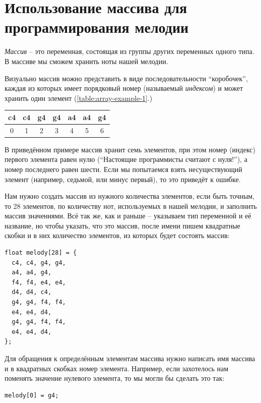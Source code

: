 \documentclass[a4paper,twoside]{book}
\newcounter{example-counter}
\begin{document}
\section{Использование массива для программирования мелодии}

\emph{Массив} -- это переменная, состоящая из группы других переменных одного
типа. В массиве мы сможем хранить ноты нашей мелодии.

Визуально массив можно представить в виде последовательности ``коробочек'',
каждая из которых имеет порядковый номер (называемый \emph{индексом}) и может
хранить один элемент (\ref{table:array-example-1}.)

\begin{tabular}{|p{1cm}|p{1cm}|p{1cm}|p{1cm}|p{1cm}|p{1cm}|p{1cm}|}
  \hline
  c4 & c4 & g4 & g4 & a4 & a4 & g4 \\
  \hline
  \multicolumn{1}{c}{0}
  & \multicolumn{1}{c}{1}
  & \multicolumn{1}{c}{2}
  & \multicolumn{1}{c}{3}
  & \multicolumn{1}{c}{4}
  & \multicolumn{1}{c}{5}
  & \multicolumn{1}{c}{6}
  \label{table:array-example-1}
\end{tabular}

В приведённом примере массив хранит семь элементов, при этом номер (индекс)
первого элемента равен нулю (``Настоящие программисты считают с нуля!''), а
номер последнего равен шести. Если мы попытаемся взять несуществующий элемент
(например, седьмой, или минус первый), то это приведёт к ошибке.

Нам нужно создать массив из нужного количества элементов, если быть точным, то
28 элементов, по количеству нот, используемых в нашей мелодии, и заполнить
массив значениями. Всё так же, как и раньше -- указываем тип переменной и её
название, но чтобы указать, что это массив, после имени пишем квадратные скобки
и в них количество элементов, из которых будет состоять массив:

\begin{verbatim}
float melody[28] = {
  c4, c4, g4, g4,
  a4, a4, g4,
  f4, f4, e4, e4,
  d4, d4, c4,
  g4, g4, f4, f4,
  e4, e4, d4,
  g4, g4, f4, f4,
  e4, e4, d4,
};
\end{verbatim}

Для обращения к определённым элементам массива нужно написать имя массива и в
квадратных скобках номер элемента. Например, если захотелось нам поменять
значение нулевого элемента, то мы могли бы сделать это так:

\begin{verbatim}
melody[0] = g4;
\end{verbatim}
\end{document}
